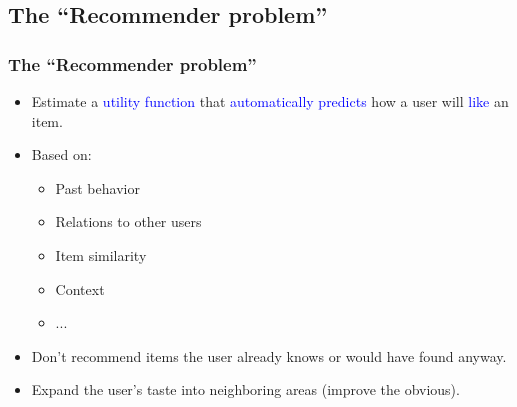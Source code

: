 \documentclass[10pt,handout,english]{beamer}
\begin{document}
		\subsection{The ``Recommender problem''}
			\begin{frame}
			\frametitle{The ``Recommender problem''}
				\begin{itemize}
					\item Estimate a \textcolor{blue}{utility function} that \textcolor{blue}{automatically predicts} how a user will \textcolor{blue}{like} an item.
					\item Based on:
						\begin{itemize}
							\item Past behavior
							\item Relations to other users
							\item Item similarity
							\item Context
							\item ...
						\end{itemize}
					\item Don't recommend items the user already knows or would have found anyway.
					\item Expand the user's taste into neighboring areas (improve the obvious).
				\end{itemize}

			\end{frame}
\end{document}
